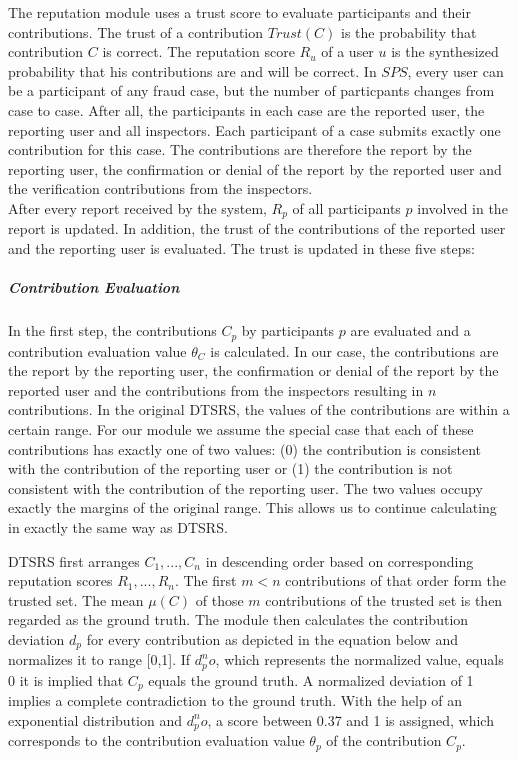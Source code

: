The reputation module uses a trust score to evaluate participants and their contributions. The trust of a contribution $Trust(C)$ is the probability that contribution $C$ is correct. The reputation score $R_u$ of a user $u$ is the synthesized probability that his contributions are and will be correct. In $SPS$, every user can be a participant of any fraud case, but the number of particpants changes from case to case. After all, the participants in each case are the reported user, the reporting user and all inspectors. Each participant of a case submits exactly one contribution for this case. The contributions are therefore the report by the reporting user, the confirmation or denial of the report by the reported user and the verification contributions from the inspectors.\\

After every report received by the system, $R_p$ of all participants $p$ involved in the report is updated. In addition, the trust of the contributions of the reported user and the reporting user is evaluated. The trust is updated in these five steps:

\subparagraph{Contribution Evaluation}In the first step, the contributions $C_p$ by participants $p$ are evaluated and a contribution evaluation value $\theta_C $ is calculated. In our case, the contributions are the report by the reporting user, the confirmation or denial of the report by the reported user and the contributions from the inspectors resulting in $n$ contributions. In the original DTSRS, the values of the contributions are within a certain range. For our module we assume the special case that each of these contributions has exactly one of two values: (0) the contribution is consistent with the contribution of the reporting user or (1) the contribution is not consistent with the contribution of the reporting user. The two values occupy exactly the margins of the original range. This allows us to continue calculating in exactly the same way as DTSRS.

DTSRS first arranges ${C_1, ..., C_n}$ in descending order based on corresponding reputation scores ${R_1, ..., R_n}$. The first $m<n$ contributions of that order form the trusted set. The mean $\mu(C)$ of those $m$ contributions of the trusted set is then regarded as the ground truth. The module then calculates the contribution deviation $d_p$ for every contribution as depicted in the equation below and normalizes it to range [0,1].  If $d_p^no$, which represents the normalized value, equals 0 it is implied that $C_p$ equals the ground truth. A normalized deviation of 1 implies a complete contradiction to the ground truth. With the help of an exponential distribution and $d_p^no$, a score between 0.37 and 1 is assigned, which corresponds to the contribution evaluation value $\theta_p $ of the contribution $C_p$.\\

